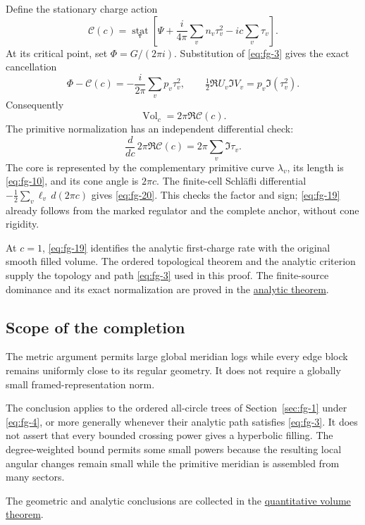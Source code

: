 Define the stationary charge action
\begin{equation}
\mathcal C(c)=\operatorname*{stat}_{\boldsymbol\tau}
 \left[\Psi+\frac{i}{4\pi}\sum_vn_v\tau_v^2
                                  -ic\sum_v\tau_v\right].
\label{eq:fg-17}
\end{equation}
At its critical point, set \(\Phi=G/(2\pi i)\). Substitution of \eqref{eq:fg-3} gives the exact cancellation
\begin{equation}
\Phi-\mathcal C(c)=-\frac{i}{2\pi}\sum_vp_v\tau_v^2,
 \qquad
 \tfrac12\Re U_v\Im V_v=p_v\Im(\tau_v^2).
\label{eq:fg-18}
\end{equation}
Consequently
\begin{equation}
\operatorname{Vol}_c
                                     =2\pi\Re\mathcal C(c).
\label{eq:fg-19}
\end{equation}
The primitive normalization has an independent differential check:
\begin{equation}
\frac{d}{dc}\,2\pi\Re\mathcal C(c)
                                  =2\pi\sum_v\Im\tau_v.
\label{eq:fg-20}
\end{equation}
The core is represented by the complementary primitive curve \(\lambda_v\), its length is \eqref{eq:fg-10}, and its cone angle is \(2\pi c\). The finite-cell Schläfli differential \(-\tfrac12\sum_v\ell_v\,d(2\pi c)\) gives \eqref{eq:fg-20}. This checks the factor and sign; \eqref{eq:fg-19} already follows from the marked regulator and the complete anchor, without cone rigidity.

At \(c=1\), \eqref{eq:fg-19} identifies the analytic first-charge rate with the original smooth filled volume. The ordered topological theorem and the analytic criterion supply the topology and path \eqref{eq:fg-3} used in this proof. The finite-source dominance and its exact normalization are proved in the \hyperref[sec:qe]{analytic theorem}.

\subsection{Scope of the completion}\label{sec:fg-7}

The metric argument permits large global meridian logs while every edge block remains uniformly close to its regular geometry. It does not require a globally small framed-representation norm.

The conclusion applies to the ordered all-circle trees of Section~\ref{sec:fg-1} under \eqref{eq:fg-4}, or more generally whenever their analytic path satisfies \eqref{eq:fg-3}. It does not assert that every bounded crossing power gives a hyperbolic filling. The degree-weighted bound permits some small powers because the resulting local angular changes remain small while the primitive meridian is assembled from many sectors.

The geometric and analytic conclusions are collected in the
\hyperref[ch:quantitative-circle-trees]{quantitative volume theorem}.

